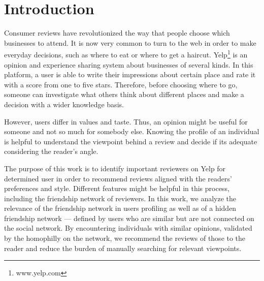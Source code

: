 \section{Introduction}
Consumer reviews have revolutionized the way that people choose which businesses
to attend. It is now very common to turn to the web in order to make everyday
decisions, such as where to eat or where to get a haircut.
Yelp\footnote{www.yelp.com} is an opinion and experience sharing system about
businesses of several kinds. In this platform, a user is able to write their
impressions about certain place and rate it with a score from one to five stars.
Therefore, before choosing where to go, someone can investigate what others
think about different places and make a decision with a wider knowledge basis.

However, users differ in values and taste. Thus, an opinion might be useful for
someone and not so much for somebody else. Knowing the profile of an individual
is helpful to understand the viewpoint behind a review and decide if its
adequate considering the reader's angle.

The purpose of this work is to identify important reviewers on Yelp for
determined user in order to recommend reviews aligned with the readers'
preferences and style. Different features might be helpful in this process,
including the friendship network of reviewers. In this work, we analyze the
relevance of the friendship network in users profiling as well as of a hidden
friendship network --- defined by users who are similar but are not connected on
the social network. By encountering individuals with similar opinions, validated
by the homophilly on the network, we recommend the reviews of those to the
reader and reduce the burden of manually searching for relevant viewpoints.
